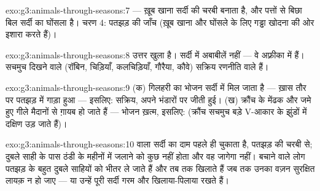 \begin{solution}{exo:g3:animals-through-seasons:7}
 --- ख़ूब खाना सर्दी की चरबी बनाता है, और पत्तों से बिछा बिल
सर्दी का घोंसला है। चरण 4: पतझड़ की जाँच (ख़ूब खाना और घोंसले के लिए
गड्ढा खोदना  की ओर इशारा करते हैं)।
\end{solution}

\begin{solution}{exo:g3:animals-through-seasons:8}
उत्तर खुला है। सर्दी में अबाबीलें नहीं --- वे अफ़्रीका में हैं। सचमुच
दिखने वाले  (रॉबिन, चिड़ियाँ, कलचिड़ियाँ, गौरैया, कौवे) सक्रिय
रणनीति वाले हैं।
\end{solution}

\begin{solution}{exo:g3:animals-through-seasons:9}
(क) गिलहरी का भोजन सर्दी में मिल जाता है --- ख़ास तौर पर पतझड़ में
गाड़ा हुआ --- इसलिए: सक्रिय, अपने भंडारों पर जीती हुई। (ख) क्रौंच के
मेंढक और  जमे हुए गीले मैदानों से ग़ायब हो जाते हैं --- भोजन ख़त्म,
इसलिए:  (क्रौंच सचमुच बड़े V-आकार के झुंडों में दक्षिण उड़ जाते
हैं)।
\end{solution}

\begin{solution}{exo:g3:animals-through-seasons:10}
 वाला सर्दी का दाम पहले ही चुकाता है, पतझड़ की चरबी से;
दुबले साही के पास ठंडी  के महीनों में जलाने को कुछ नहीं होता और वह
जागेगा नहीं। बचाने वाले लोग पतझड़ के बहुत दुबले साहियों को भीतर ले
जाते हैं और तब तक खिलाते हैं जब तक उनका वज़न सुरक्षित  लायक़
न हो जाए --- या उन्हें पूरी सर्दी गरम और खिलाया-पिलाया रखते हैं।
\end{solution}
